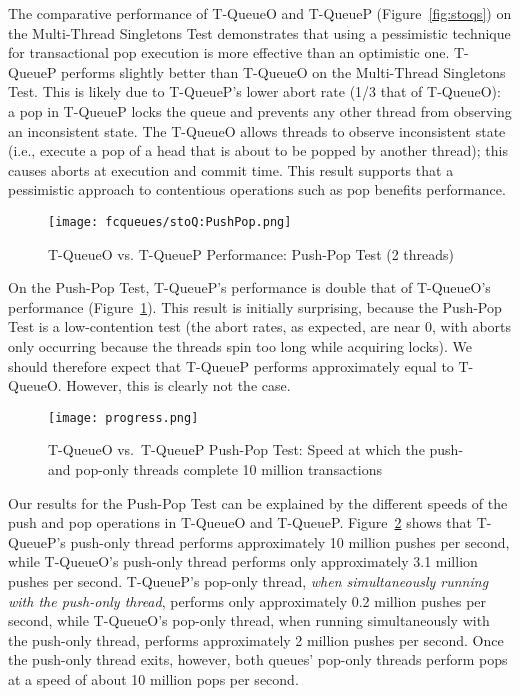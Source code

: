 The comparative performance of T-QueueO and T-QueueP (Figure~\ref{fig:stoqs}) on the Multi-Thread Singletons Test demonstrates that using a pessimistic technique for transactional pop execution is more effective than an optimistic one. T-QueueP performs slightly better than T-QueueO on the Multi-Thread Singletons Test. This is likely due to T-QueueP's lower abort rate (1/3 that of T-QueueO): a pop in T-QueueP locks the queue and prevents any other thread from observing an inconsistent state. The T-QueueO allows threads to observe inconsistent state (i.e., execute a pop of a head that is about to be popped by another thread); this causes aborts at execution and commit time.
This result supports that a pessimistic approach to contentious operations such as pop benefits performance.

\begin{figure}[t]
    \centering
	\begin{minipage}{\textwidth}
        {\texttt{[image: fcqueues/stoQ:PushPop.png]}}
	\end{minipage}
    \caption{T-QueueO vs. T-QueueP Performance: Push-Pop Test (2 threads)}
    \label{fig:stoqs_pp}
\end{figure}

    On the Push-Pop Test, T-QueueP's performance is double that of T-QueueO's performance (Figure~\ref{fig:stoqs_pp}). This result is initially surprising, because the Push-Pop Test is a low-contention test (the abort rates, as expected, are near 0, with aborts only occurring because the threads spin too long while acquiring locks). We should therefore expect that T-QueueP performs approximately equal to T-QueueO. However, this is clearly not the case.

\begin{figure}[t]
    \centering
        {\texttt{[image: progress.png]}}
    \caption{T-QueueO vs.\ T-QueueP Push-Pop Test: Speed at which the push- and pop-only threads complete 10 million transactions}
    \label{fig:sto_progress}
\end{figure}

Our results for the Push-Pop Test can be explained by the different speeds of the push and pop operations in T-QueueO and T-QueueP. Figure~\ref{fig:sto_progress} shows that T-QueueP's push-only thread performs approximately 10 million pushes per second, while T-QueueO's push-only thread performs only approximately 3.1 million pushes per second. T-QueueP's pop-only thread, \emph{when simultaneously running with the push-only thread}, performs only approximately 0.2 million pushes per second, while T-QueueO's pop-only thread, when running simultaneously with the push-only thread, performs approximately 2 million pushes per second.
Once the push-only thread exits, however, both queues' pop-only threads perform pops at a speed of about 10 million pops per second.


